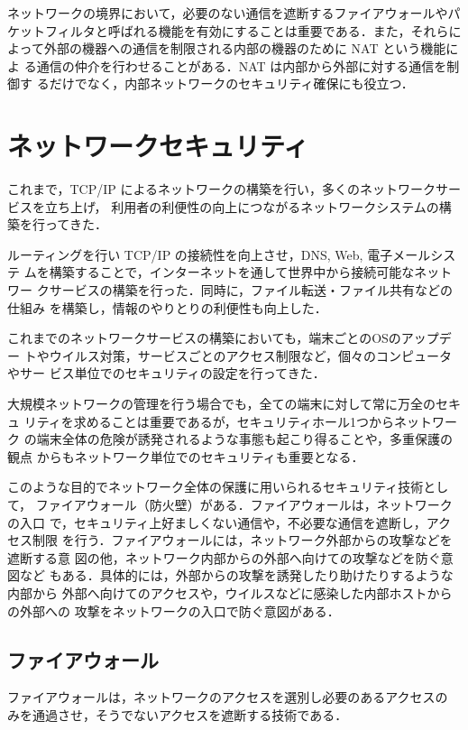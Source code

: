 ネットワークの境界において，必要のない通信を遮断するファイアウォールやパ
ケットフィルタと呼ばれる機能を有効にすることは重要である．また，それらに
よって外部の機器への通信を制限される内部の機器のために NAT という機能によ
る通信の仲介を行わせることがある．NAT は内部から外部に対する通信を制御す
るだけでなく，内部ネットワークのセキュリティ確保にも役立つ．

\section{ネットワークセキュリティ}
これまで，TCP/IP によるネットワークの構築を行い，多くのネットワークサービスを立ち上げ，
利用者の利便性の向上につながるネットワークシステムの構築を行ってきた．

ルーティングを行い TCP/IP の接続性を向上させ，DNS, Web, 電子メールシステ
ムを構築することで，インターネットを通して世界中から接続可能なネットワー
クサービスの構築を行った．同時に，ファイル転送・ファイル共有などの仕組み
を構築し，情報のやりとりの利便性も向上した．

これまでのネットワークサービスの構築においても，端末ごとのOSのアップデー
トやウイルス対策，サービスごとのアクセス制限など，個々のコンピュータやサー
ビス単位でのセキュリティの設定を行ってきた．

大規模ネットワークの管理を行う場合でも，全ての端末に対して常に万全のセキュ
リティを求めることは重要であるが，セキュリティホール1つからネットワーク
の端末全体の危険が誘発されるような事態も起こり得ることや，多重保護の観点
からもネットワーク単位でのセキュリティも重要となる．

このような目的でネットワーク全体の保護に用いられるセキュリティ技術として，
ファイアウォール（防火壁）がある．ファイアウォールは，ネットワークの入口
で，セキュリティ上好ましくない通信や，不必要な通信を遮断し，アクセス制限
を行う．ファイアウォールには，ネットワーク外部からの攻撃などを遮断する意
図の他，ネットワーク内部からの外部へ向けての攻撃などを防ぐ意図など
もある．具体的には，外部からの攻撃を誘発したり助けたりするような内部から
外部へ向けてのアクセスや，ウイルスなどに感染した内部ホストからの外部への
攻撃をネットワークの入口で防ぐ意図がある．

\subsection{ファイアウォール}
ファイアウォールは，ネットワークのアクセスを選別し必要のあるアクセスの
みを通過させ，そうでないアクセスを遮断する技術である．

